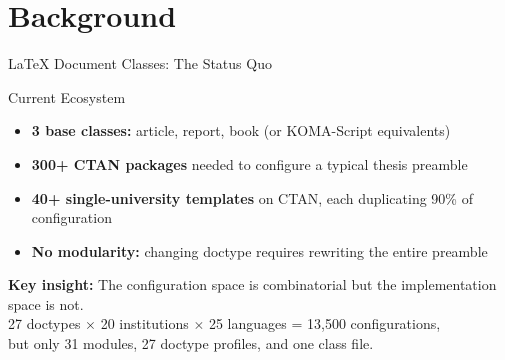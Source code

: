 \documentclass[
  doctype=beamer,
  beameraspectratio=169,
  beamertheme=Copenhagen,
  language=english,
]{omnilatex}
\begin{document}
\section{Background}

\begin{frame}{LaTeX Document Classes: The Status Quo}
  \begin{block}{Current Ecosystem}
    \begin{itemize}
      \item \textbf{3 base classes:} article, report, book (or KOMA-Script equivalents)
      \item \textbf{300+ CTAN packages} needed to configure a typical thesis preamble
      \item \textbf{40+ single-university templates} on CTAN, each duplicating 90\% of configuration
      \item \textbf{No modularity:} changing doctype requires rewriting the entire preamble
    \end{itemize}
  \end{block}

  \vspace{1em}
  \begin{center}
    \textbf{Key insight:} The configuration space is combinatorial but the implementation space is not.\\
    27 doctypes $\times$ 20 institutions $\times$ 25 languages = 13,500 configurations,\\
    but only 31 modules, 27 doctype profiles, and one class file.
  \end{center}
\end{frame}
\end{document}
